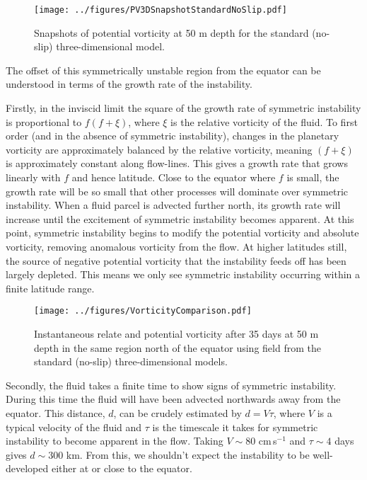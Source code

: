 \begin{figure}
    \centering
    \texttt{[image: ../figures/PV3DSnapshotStandardNoSlip.pdf]}
    \caption{Snapshots of potential vorticity at 50 m depth for the standard (no-slip) three-dimensional model.}
    \label{fig:PVStandardNoSlip3D}
\end{figure}

The offset of this symmetrically unstable region from the equator can be understood in terms of the growth rate of the instability.

Firstly, in the inviscid limit the square of the growth rate of symmetric instability is proportional to $f(f + \xi)$, where $\xi$ is the relative vorticity of the fluid. To first order (and in the absence of symmetric instability), changes in the planetary vorticity are approximately balanced by the relative vorticity, meaning $(f + \xi)$ is approximately constant along flow-lines. This gives a growth rate that grows linearly with $f$ and hence latitude. Close to the equator where $f$ is small, the growth rate will be so small that other processes will dominate over symmetric instability. When a fluid parcel is advected further north, its growth rate will increase until the excitement of symmetric instability becomes apparent. At this point, symmetric instability begins to modify the potential vorticity and absolute vorticity, removing anomalous vorticity from the flow. At higher latitudes still, the source of negative potential vorticity that the instability feeds off has been largely depleted. This means we only see symmetric instability occurring within a finite latitude range.

\begin{figure}
    \centering
    \texttt{[image: ../figures/VorticityComparison.pdf]}
    \caption{Instantaneous relate and potential vorticity after 35 days at 50 m depth in the same region north of the equator using field from the standard (no-slip) three-dimensional models.}
    \label{fig:EddyRelativeAndAbsoluteVorticity}
\end{figure}

Secondly, the fluid takes a finite time to show signs of symmetric instability. During this time the fluid will have been advected northwards away from the equator. This distance, $d$, can be crudely estimated by $d = V \tau$, where $V$ is a typical velocity of the fluid and $\tau$ is the timescale it takes for symmetric instability to become apparent in the flow. Taking $V\sim 80$ cm\,s$^{-1}$ and $\tau \sim 4$ days gives $d \sim 300$ km. From this, we shouldn't expect the instability to be well-developed either at or close to the equator.


